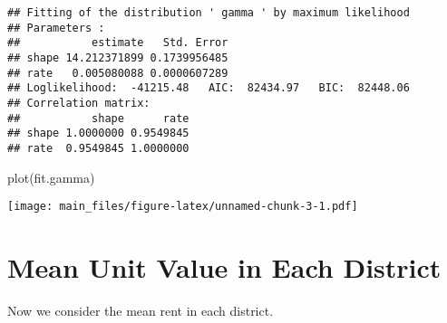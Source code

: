 \documentclass[
]{article}
\newenvironment{Shaded}{\begin{snugshade}}{\end{snugshade}}
\newcommand{\FunctionTok}[1]{\textcolor[rgb]{0.00,0.00,0.00}{#1}}
\newcommand{\NormalTok}[1]{#1}
\begin{document}
\begin{verbatim}
## Fitting of the distribution ' gamma ' by maximum likelihood 
## Parameters : 
##           estimate   Std. Error
## shape 14.212371899 0.1739956485
## rate   0.005080088 0.0000607289
## Loglikelihood:  -41215.48   AIC:  82434.97   BIC:  82448.06 
## Correlation matrix:
##           shape      rate
## shape 1.0000000 0.9549845
## rate  0.9549845 1.0000000
\end{verbatim}

\begin{Shaded}
\begin{Highlighting}[]
\FunctionTok{plot}\NormalTok{(fit.gamma)}
\end{Highlighting}
\end{Shaded}

\texttt{[image: main\_files/figure-latex/unnamed-chunk-3-1.pdf]}

\hypertarget{mean-unit-value-in-each-district}{%
\section{Mean Unit Value in Each
District}\label{mean-unit-value-in-each-district}}

Now we consider the mean rent in each district.
\end{document}
